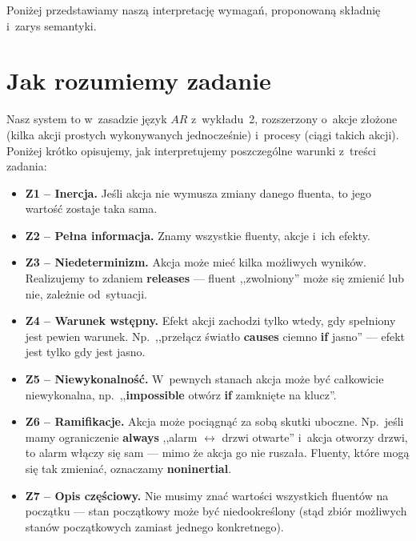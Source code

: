 \documentclass[11pt,a4paper]{article}
\newcommand{\causes}{\textbf{causes}}
\renewcommand{\iff}{\textbf{if}}
\newcommand{\always}{\textbf{always}}
\newcommand{\impossible}{\textbf{impossible}}
\newcommand{\releases}{\textbf{releases}}
\newcommand{\noninertial}{\textbf{noninertial}}
\begin{document}
Poniżej przedstawiamy naszą interpretację wymagań, proponowaną składnię
i~zarys semantyki.

\section{Jak rozumiemy zadanie}

Nasz system to w~zasadzie język $AR$ z~wykładu~2, rozszerzony o~akcje złożone
(kilka akcji prostych wykonywanych jednocześnie) i~procesy (ciągi takich akcji).
Poniżej krótko opisujemy, jak interpretujemy poszczególne warunki z~treści zadania:

\begin{itemize}
  \item \textbf{Z1 -- Inercja.} Jeśli akcja nie wymusza zmiany danego fluenta, to jego wartość zostaje taka sama.

  \item \textbf{Z2 -- Pełna informacja.} Znamy wszystkie fluenty, akcje i~ich efekty.

  \item \textbf{Z3 -- Niedeterminizm.} Akcja może mieć kilka możliwych wyników.
        Realizujemy to zdaniem \releases{} --- fluent ,,zwolniony'' może się zmienić
        lub nie, zależnie od~sytuacji.

  \item \textbf{Z4 -- Warunek wstępny.} Efekt akcji zachodzi tylko wtedy, gdy
        spełniony jest pewien warunek. Np.\ ,,przełącz światło \causes{} ciemno
        \iff{} jasno'' --- efekt jest tylko gdy jest jasno.

  \item \textbf{Z5 -- Niewykonalność.} W~pewnych stanach akcja może być całkowicie
        niewykonalna, np.\ ,,\impossible{} otwórz \iff{} zamknięte na klucz''.

  \item \textbf{Z6 -- Ramifikacje.} Akcja może pociągnąć za sobą skutki uboczne.
        Np.\ jeśli mamy ograniczenie \always{} ,,alarm $\leftrightarrow$ drzwi otwarte''
        i~akcja otworzy drzwi, to alarm włączy się sam --- mimo że akcja go nie ruszała.
        Fluenty, które mogą się tak zmieniać, oznaczamy \noninertial{}.

  \item \textbf{Z7 -- Opis częściowy.} Nie musimy znać wartości wszystkich fluentów
        na początku --- stan początkowy może być niedookreślony
        (stąd zbiór możliwych stanów początkowych zamiast jednego konkretnego).
\end{itemize}
\end{document}
